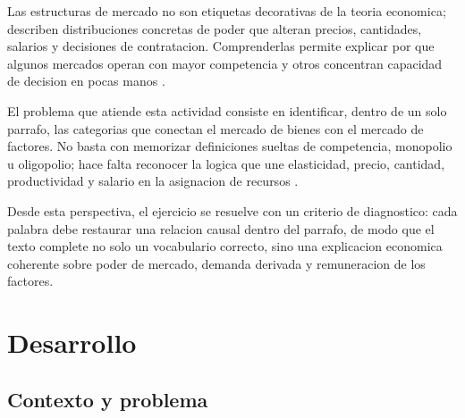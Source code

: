 \documentclass[
	spanish,
	letterpaper, oneside
]{article}
\begin{document}
Las estructuras de mercado no son etiquetas decorativas de la teoria economica; describen distribuciones concretas de poder que alteran precios, cantidades, salarios y decisiones de contratacion. Comprenderlas permite explicar por que algunos mercados operan con mayor competencia y otros concentran capacidad de decision en pocas manos \citep{ucnlPresentacionMicroeconomia2026}.

El problema que atiende esta actividad consiste en identificar, dentro de un solo parrafo, las categorias que conectan el mercado de bienes con el mercado de factores. No basta con memorizar definiciones sueltas de competencia, monopolio u oligopolio; hace falta reconocer la logica que une elasticidad, precio, cantidad, productividad y salario en la asignacion de recursos \citep{pindyck2018microeconomia}.

Desde esta perspectiva, el ejercicio se resuelve con un criterio de diagnostico: cada palabra debe restaurar una relacion causal dentro del parrafo, de modo que el texto complete no solo un vocabulario correcto, sino una explicacion economica coherente sobre poder de mercado, demanda derivada y remuneracion de los factores.

%
%
\section{Desarrollo}

\subsection{Contexto y problema}
\end{document}
